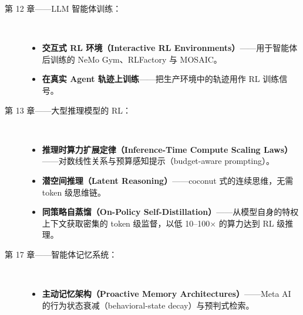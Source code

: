 \documentclass[11pt,a4paper,openany]{book}
\begin{document}
\begin{description}
  \item[第 12 章——LLM 智能体训练：]~
    \begin{itemize}
      \item \textbf{交互式 RL 环境（Interactive RL Environments）}——用于智能体后训练的 NeMo Gym、RLFactory 与 MOSAIC。
      \item \textbf{在真实 Agent 轨迹上训练}——把生产环境中的轨迹用作 RL 训练信号。
    \end{itemize}

  \item[第 13 章——大型推理模型的 RL：]~
    \begin{itemize}
      \item \textbf{推理时算力扩展定律（Inference-Time Compute Scaling Laws）}——对数线性关系与预算感知提示（budget-aware prompting）。
      \item \textbf{潜空间推理（Latent Reasoning）}——coconut 式的连续思维，无需 token 级思维链。
      \item \textbf{同策略自蒸馏（On-Policy Self-Distillation）}——从模型自身的特权上下文获取密集的 token 级监督，以低 10--100$\times$ 的算力达到 RL 级推理。
    \end{itemize}

  \item[第 17 章——智能体记忆系统：]~
    \begin{itemize}
      \item \textbf{主动记忆架构（Proactive Memory Architectures）}——Meta AI 的行为状态衰减（behavioral-state decay）与预判式检索。
    \end{itemize}


\end{description}
\end{document}
